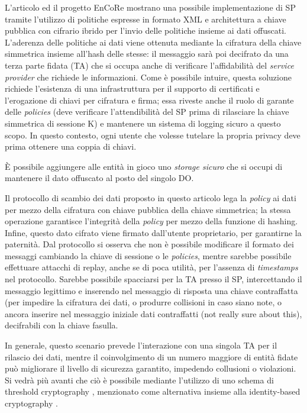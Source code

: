 L’articolo \cite{pearson2011sticky} ed il progetto EnCoRe mostrano una possibile implementazione di SP tramite l’utilizzo di politiche espresse in formato XML e architettura a chiave pubblica con cifrario ibrido per l’invio delle politiche insieme ai dati offuscati. L’aderenza delle politiche ai dati viene ottenuta mediante la cifratura della chiave simmetrica insieme all’hash delle stesse: il messaggio sar\`a poi decifrato da una terza parte fidata (TA) che si occupa anche di verificare l’affidabilit\`a del \textit{service provider} che richiede le informazioni. Come \`e possibile intuire, questa soluzione richiede l’esistenza di una infrastruttura per il supporto di certificati e l’erogazione di chiavi per cifratura e firma; essa riveste anche il ruolo di garante delle \textit{policies} (deve verificare l’attendibilit\`a del SP prima di rilasciare la chiave simmetrica di sessione K) e mantenere un sistema di logging sicuro a questo scopo. In questo contesto, ogni utente che volesse tutelare la propria privacy deve prima ottenere una coppia di chiavi. 

\`E possibile aggiungere alle entit\`a in gioco uno \textit{storage sicuro} che si occupi di mantenere il dato offuscato al posto del singolo DO.

Il protocollo di scambio dei dati proposto in questo articolo lega la \textit{policy} ai dati per mezzo della cifratura con chiave pubblica della chiave simmetrica; la stessa operazione garantisce l’integrit\`a della \textit{policy} per mezzo della funzione di hashing. Infine, questo dato cifrato viene firmato dall’utente proprietario, per garantirne la paternit\`a. Dal protocollo si osserva che non \`e possibile modificare il formato dei messaggi cambiando la chiave di sessione o le \textit{policies}, mentre sarebbe possibile effettuare attacchi di replay, anche se di poca utilit\`a, per l’assenza di \textit{timestamps} nel protocollo. Sarebbe possibile spacciarsi per la TA presso il SP, intercettando il messaggio legittimo e inserendo nel messaggio di risposta una chiave contraffatta (per impedire la cifratura dei dati, o produrre collisioni in caso siano note, o ancora inserire nel messaggio iniziale dati contraffatti (not really sure about this), decifrabili con la chiave fasulla.

In generale, questo scenario prevede l’interazione con una singola TA per il rilascio dei dati, mentre il coinvolgimento di un numero maggiore di entit\`a fidate può migliorare il livello di sicurezza garantito, impedendo collusioni o violazioni. Si vedr\`a pi\`u avanti che ci\`o \`e possibile mediante l’utilizzo di uno schema di threshold cryptography \cite{shamir1979share}, menzionato come alternativa insieme alla identity-based cryptography \cite{shamir1984identity}.

